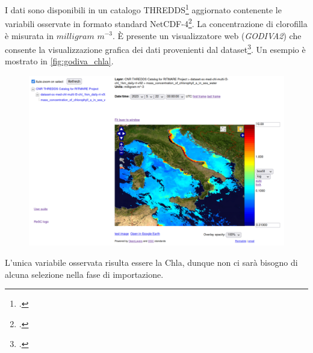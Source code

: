 \documentclass[./main.tex]{subfiles}
\begin{document}
I dati sono disponibili in un catalogo THREDDS\footcite[\url{http://ritmare.artov.ismar.cnr.it/thredds/ritmare/SatelliteOS/OC/catalog.html?dataset=CHL_CASE12_A}]{thredds-chla} aggiornato contenente le variabili osservate in formato standard NetCDF-4\footcite[19-47]{HFR_QC_JERICO}. La concentrazione di clorofilla è misurata in  $milligram$ $m^{-3}$. È presente un visualizzatore web (\textit{GODIVA2}) che consente la visualizzazione grafica dei dati provenienti dal dataset\footcite{blower2009godiva2}. Un esempio è mostrato in \autoref{fig:godiva_chla}.

\begin{figure}[!ht]
\noindent\begin{minipage}{\textwidth}
\vspace{1cm}
\centering
\includegraphics[width=\textwidth]{images/godiva_chla.pdf}
\captionsetup{font=small, hypcap=false}
\label{fig:godiva_chla}
\end{minipage}
\vspace{0.25cm}
\end{figure}

L'unica variabile osservata risulta essere la Chla, dunque non ci sarà bisogno di alcuna selezione nella fase di importazione.
\end{document}

